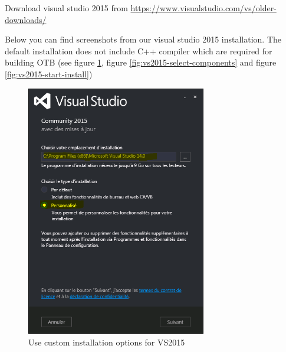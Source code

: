 \documentclass[10pt,a4paper]{article}
\begin{document}
Download visual studio 2015 from
\url{https://www.visualstudio.com/vs/older-downloads/}

Below you can find screenshots from our visual studio 2015
installation.  The default installation does not include C++ compiler
which are required for building OTB (see figure
\ref{fig:vs2015-custom-install}, figure
\ref{fig:vs2015-select-components} and figure
\ref{fig:vs2015-start-install})

\begin{figure}[!htbp]
  \center
  \includegraphics[width=0.7\textwidth]{Art/vs2015-custom-install.png}
  \caption[]{Use custom installation options for VS2015}
  \label{fig:vs2015-custom-install}
\end{figure}
\end{document}

